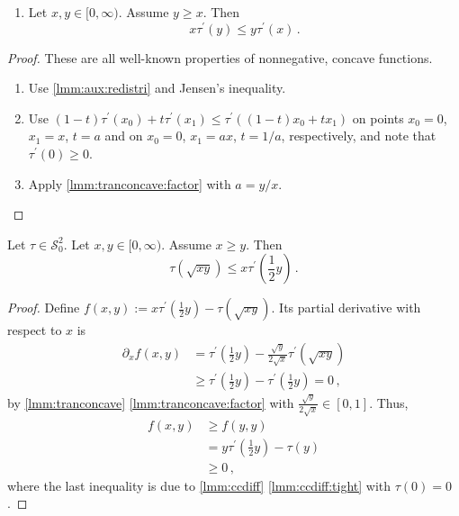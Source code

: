 \documentclass{article}
\newcommand{\lb}{\left(} %
\newcommand{\rb}{\right)} %
\newcommand{\br}[1]{\lb #1 \rb} %
\newcommand{\brOf}[1]{\!\br{#1}} %
\newcommand*{\mc}[1]{\mathcal{#1}}
\newcommand{\Rp}{[0, \infty)} %
\newcommand{\pr}{^\prime}
\newcommand{\equationFullstop}{\, .}
\newcommand{\eqfs}{\equationFullstop}
\newcommand{\equationComma}{\, ,}
\newcommand{\eqcm}{\equationComma}
\newcommand{\tran}{\tau}
\newcommand{\dtran}{\tran\pr}
\newcommand{\setccod}[1]{\mc S_0^{#1}}
\begin{document}
\begin{appendix}
\begin{lemma}
\begin{enumerate}[label=(\roman*)]
\begin{align*}
			\dtran(ax) &\leq a\dtran(x) \text{ for } a\geq 1
			\eqfs
		\end{align*}
		\item\label{lmm:tranconcave:balance} Let $x,y\in\Rp$. Assume $y\geq x$. Then
		\begin{equation*}
			x \dtran(y) \leq y \dtran(x)
			\eqfs
		\end{equation*}
	\end{enumerate}
\end{lemma}
%
\begin{proof}
	These are all well-known properties of nonnegative, concave functions.
	\begin{enumerate}[label=(\roman*)]
		\item Use \cref{lmm:aux:redistri} and Jensen's inequality.
		\item Use $(1-t)\dtran(x_0) + t \dtran(x_1) \leq \dtran((1-t) x_0 + t x_1)$ on points $x_0=0$, $x_1=x$, $t = a$ and on $x_0=0$, $x_1=ax$, $t = 1/a$, respectively, and note that $\dtran(0)\geq0$.
		\item Apply \ref{lmm:tranconcave:factor} with $a = y/x$.
	\end{enumerate}
\end{proof}
%
\begin{lemma}\label{lmm:cc:transdtran}
	Let $\tran\in\setccod2$.
	Let $x,y\in\Rp$. Assume $x \geq y$. Then
	\begin{equation*}
		\tran\brOf{\sqrt{xy}} \leq x \dtran\brOf{\frac12 y}\eqfs
	\end{equation*} 
\end{lemma}
%
\begin{proof}
	Define $f(x, y) := x \dtran(\frac12 y) - \tran(\sqrt{xy})$. Its partial derivative with respect to $x$ is
	\begin{align*}
		\partial_x f(x, y)
		&= 
		\dtran\brOf{\frac12 y} - \frac{\sqrt{y}}{2\sqrt{x}}\dtran\brOf{\sqrt{xy}}
		\\&\geq  
		\dtran\brOf{\frac12 y} - \dtran\brOf{\frac12 y} = 0
		\eqcm
	\end{align*}
	by \cref{lmm:tranconcave} \ref{lmm:tranconcave:factor} with $\frac{\sqrt{y}}{2\sqrt{x}} \in [0,1]$. Thus, 
	\begin{align*}
		f(x, y) 
		&\geq 
		f(y, y) 
		\\&= 
		y \dtran\brOf{\frac12 y} - \tran(y)
		\\&\geq 
		0\eqcm
	\end{align*}
	where the last inequality is due to \cref{lmm:ccdiff} \ref{lmm:ccdiff:tight} with $\tran(0) = 0$.
\end{proof}
%
%
%
%
%

\end{appendix}
\end{document}
